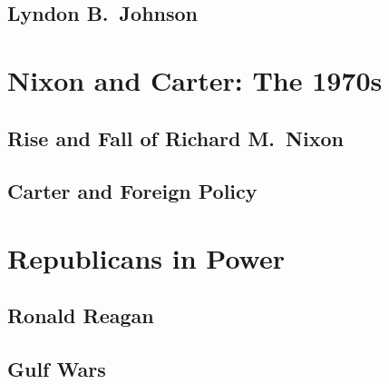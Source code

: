 \subsection*{Lyndon B.\ Johnson}

\section{Nixon and Carter: The 1970s}

\subsection*{Rise and Fall of Richard M.\ Nixon}

\subsection*{Carter and Foreign Policy}

\section{Republicans in Power}

\subsection*{Ronald Reagan}

\subsection*{Gulf Wars}
